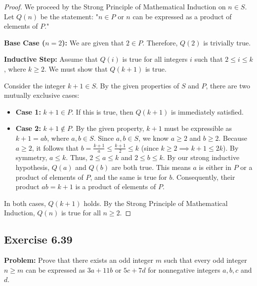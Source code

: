 \documentclass[11pt, a4paper]{article}
\theoremstyle{definition}
\theoremstyle{remark}
\begin{document}
\begin{proof}
    We proceed by the Strong Principle of Mathematical Induction on $n \in S$. Let $Q(n)$ be the statement: "$n \in P$ or $n$ can be expressed as a product of elements of $P$."
    
    \textbf{Base Case ($n=2$):}
    We are given that $2 \in P$. Therefore, $Q(2)$ is trivially true.
    
    \textbf{Inductive Step:}
    Assume that $Q(i)$ is true for all integers $i$ such that $2 \le i \le k$, where $k \ge 2$. We must show that $Q(k+1)$ is true.
    
    Consider the integer $k+1 \in S$. By the given properties of $S$ and $P$, there are two mutually exclusive cases:
    \begin{itemize}
        \item \textbf{Case 1:} $k+1 \in P$. If this is true, then $Q(k+1)$ is immediately satisfied.
        \item \textbf{Case 2:} $k+1 \notin P$. By the given property, $k+1$ must be expressible as $k+1 = ab$, where $a, b \in S$. 
        Since $a, b \in S$, we know $a \ge 2$ and $b \ge 2$. 
        Because $a \ge 2$, it follows that $b = \frac{k+1}{a} \le \frac{k+1}{2} \le k$ (since $k \ge 2 \implies k+1 \le 2k$). 
        By symmetry, $a \le k$. 
        Thus, $2 \le a \le k$ and $2 \le b \le k$. 
        By our strong inductive hypothesis, $Q(a)$ and $Q(b)$ are both true. This means $a$ is either in $P$ or a product of elements of $P$, and the same is true for $b$. 
        Consequently, their product $ab = k+1$ is a product of elements of $P$.
    \end{itemize}
    In both cases, $Q(k+1)$ holds. By the Strong Principle of Mathematical Induction, $Q(n)$ is true for all $n \ge 2$.
\end{proof}

\subsection{Exercise 6.39}
\textbf{Problem:} Prove that there exists an odd integer $m$ such that every odd integer $n \ge m$ can be expressed as $3a + 11b$ or $5c + 7d$ for nonnegative integers $a, b, c$ and $d$.
\end{document}

